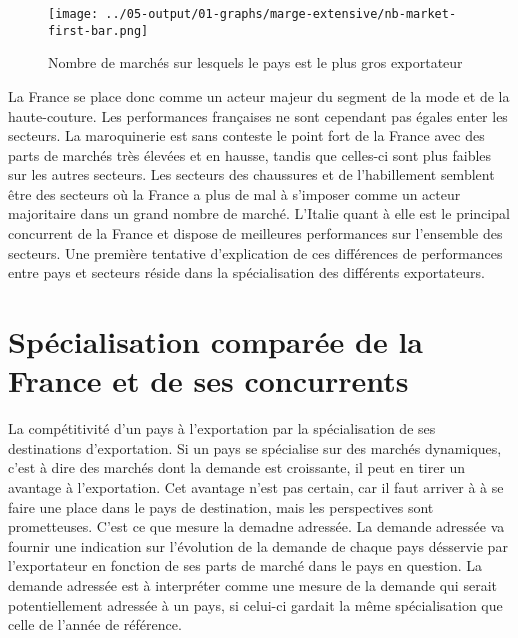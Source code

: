 \documentclass[french,10pt,a4paper]{article}
\begin{document}
\begin{figure}[!h]
  \centering  \texttt{[image: ../05-output/01-graphs/marge-extensive/nb-market-first-bar.png]}
  \caption{Nombre de marchés sur lesquels le pays est le plus gros exportateur}
  \label{fig:nb-market-first-bar}
\end{figure}

\medskip

La France se place donc comme un acteur majeur du segment de la mode et de la haute-couture. Les performances françaises ne sont cependant pas égales enter les secteurs. La maroquinerie est sans conteste le point fort de la France avec des parts de marchés très élevées et en hausse, tandis que celles-ci sont plus faibles sur les autres secteurs. Les secteurs des chaussures et de l'habillement semblent être des secteurs où la France a plus de mal à s'imposer comme un acteur majoritaire dans un grand nombre de marché. L'Italie quant à elle est le principal concurrent de la France et dispose de meilleures performances sur l'ensemble des secteurs. Une première tentative d'explication de ces différences de performances entre pays et secteurs réside dans la spécialisation des différents exportateurs.


\section{Spécialisation comparée de la France et de ses concurrents}
La compétitivité d'un pays à l'exportation par la spécialisation de ses destinations d'exportation. Si un pays se spécialise sur des marchés dynamiques, c'est à dire des marchés dont la demande est croissante, il peut en tirer un avantage à l'exportation. Cet avantage n'est pas certain, car il faut arriver à à se faire une place dans le pays de destination, mais les perspectives sont prometteuses. C'est ce que mesure la demadne adressée. La demande adressée va fournir une indication sur l'évolution de la demande de chaque pays désservie par l'exportateur en fonction de ses parts de marché dans le pays en question. La demande adressée est à interpréter comme une mesure de la demande qui serait potentiellement adressée à un pays, si celui-ci gardait la même spécialisation que celle de l'année de référence.  
\end{document}
